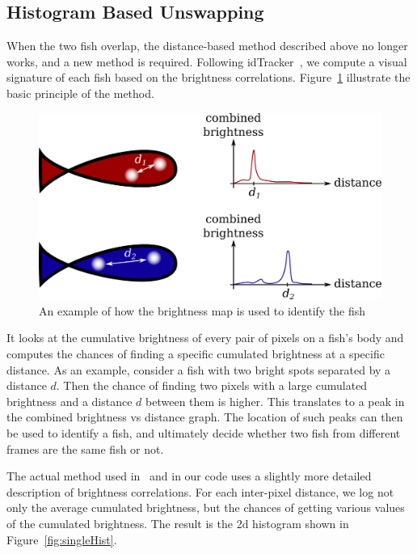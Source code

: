 \documentclass{article}
\begin{document}


\subsection{Histogram Based Unswapping}

When the two fish overlap, the distance-based method described above no longer works, and a new method is required. Following idTracker~\cite{perez-escudero_idtracker_2014}, we compute a visual signature of each fish based on the brightness correlations. Figure~\ref{fig:brightness-correlation} illustrate the basic principle of the method. 

\begin{figure}[H]
	\centering
	\includegraphics[width=0.6\linewidth]{brightness-correlation}
	\caption{An example of how the brightness map is used to identify the fish}
	\label{fig:brightness-correlation}
\end{figure}

It looks at the cumulative brightness of every pair of pixels on a fish's body and computes the chances of finding a specific cumulated brightness at a specific distance. As an example, consider a fish with two bright spots separated by a distance $d$. Then the chance of finding two pixels with a large cumulated brightness and a distance $d$ between them is higher. This translates to a peak in the combined brightness vs distance graph. The location of such peaks can then be used to identify a fish, and ultimately decide whether two fish from different frames are the same fish or not. 

The actual method used in~\cite{perez-escudero_idtracker_2014} and in our code uses a slightly more detailed description of brightness correlations. For each inter-pixel distance, we log not only the average cumulated brightness, but the chances of getting various values of the cumulated brightness. The result is the 2d histogram shown in Figure~\ref{fig:singleHist}.
\end{document}
